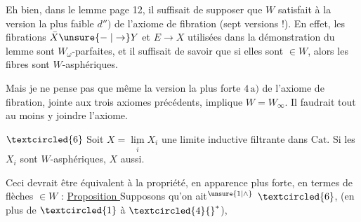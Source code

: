 

Eh bien, dans le lemme page 12, il suffisait de supposer que $W$ satisfait à la version la plus faible $d'')$ de l'axiome de fibration (sept versions !). En effet, les fibrations $\bar X\unsure{\mathrel{-}|\to}Y$ et $E\to X$ utilisées dans la démonstration du lemme sont $W_\omega$-parfaites, et il suffisait de savoir que si elles sont $\in W$, alors les fibres sont $W$-asphériques.

Mais je ne pense pas que même la version la plus forte $4\,\mathrm a)$ de  l'axiome de fibration, jointe aux trois axiomes précédents, implique $W=W_\infty$. Il faudrait tout au moins y joindre l'axiome.


$\textcircled{6}$ Soit $X=\underset{i}{\underline{\lim}}X_i$ une limite inductive filtrante dans $\mathrm{Cat}$. Si les $X_i$ sont $W$-asphériques, $X$ aussi.

Ceci devrait être équivalent à la propriété, en apparence plus forte, en termes de  flèches $\in W$ :
\uline{Proposition } Supposons qu'on ait$^{\unsure{1|\wedge}}$ $\textcircled{6}$, (en plus de $\textcircled{1}$ à $\textcircled{4}{}^*$),


